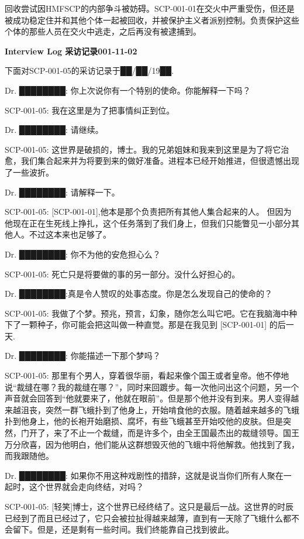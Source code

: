 \documentclass[openany,a4paper]{book} %
\begin{document}
回收尝试因HMFSCP的内部争斗被妨碍。SCP-001-01在交火中严重受伤，但还是被成功稳定住并和其他个体一起被回收，并被保护主义者派别控制。负责保护这些个体的那些人员在交火中逃走，之后再没有被逮捕到。\vspace{12pt}

\textbf{Interview Log 采访记录001-11-02}\vspace{12pt}

下面对SCP-001-05的采访记录于██/██/19██.\vspace{20pt}


Dr. ████████: 你上次说你有一个特别的使命。你能解释一下吗？

SCP-001-05: 我在这里是为了把事情纠正到位。

Dr. ████████: 请继续。

SCP-001-05: 这世界是破损的，博士。我的兄弟姐妹和我来到这里是为了将它治愈，我们集合起来并为将要到来的做好准备。进程本已经开始推进，但很遗憾出现了一些波折。

Dr. ████████: 请解释一下。

SCP-001-05: [SCP-001-01],他本是那个负责把所有其他人集合起来的人。 但因为他现在正在生死线上挣扎，这个任务落到了我们身上，但我们只能瞥见一小部分其他人。不过这本来也足够了。

Dr. ████████: 你不为他的安危担心么？

SCP-001-05: 死亡只是将要做的事的另一部分。没什么好担心的。

Dr. ████████:真是令人赞叹的处事态度。你是怎么发现自己的使命的？

SCP-001-05: 我做了个梦。预兆，预言，幻象，随你怎么叫它吧。它在我脑海中种下了一颗种子，你可能会把这叫做一种直觉。那是在我见到 [SCP-001-01] 的后一天.

Dr. ████████: 你能描述一下那个梦吗？

SCP-001-05: 那里有个男人，穿着很华丽，看起来像个国王或者皇帝。他不停地说“裁缝在哪？我的裁缝在哪？”，同时来回踱步。每一次他问出这个问题，另一个声音就会回答到“他就要来了，他就在眼前”。但是那个他并没有到来。男人变得越来越沮丧，突然一群飞蛾扑到了他身上，开始啃食他的衣服。随着越来越多的飞蛾扑到他身上，他的长袍开始磨损、腐坏，有些飞蛾甚至开始咬他的皮肤。但是突然，门开了，来了不止一个裁缝，而是许多个，由全王国最杰出的裁缝领导。国王万分欣喜，因为他明白，他们能从这群想毁灭他的飞蛾中将他解救。他找到了我，而我跟随他。

Dr. ████████: 如果你不用这种戏剧性的措辞，这就是说当你们所有人聚在一起时，这个世界就会走向终结，对吗？

SCP-001-05: [轻笑]博士，这个世界已经终结了。这只是最后一战。这世界的时辰已经到了而且已经过了，它只会被拉扯得越来越薄，直到有一天除了飞蛾什么都不会留下。但是，还是剩有一些时间。我们终能靠自己找到彼此。
\end{document}
